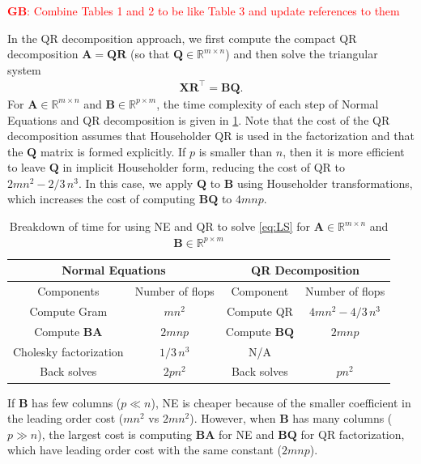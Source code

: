 \documentclass{article}
\newcommand{\mat}[1]{\mathbf{#1}}
\newcommand{\GB}[1]{\textcolor{red}{\textbf{GB}: #1}}
\begin{document}
\GB{Combine Tables 1 and 2 to be like Table 3 and update references to them}


In the QR decomposition approach, we first compute the compact QR decomposition $\mat{A} = \mat{Q}\mat{R}$ (so that $\mat{Q}\in \mathbb{R}^{m \times n}$) and then solve the  triangular system
\begin{align}
\label{eq:QR}  
\mat{X} \mat{R}^\top = \mat{B}\mat{Q}.
\end{align}
For $\mat{A} \in \mathbb{R}^{m \times n}$ and $\mat{B} \in \mathbb{R}^{p \times m}$, the time complexity of each step of Normal Equations and QR decomposition is given in \cref{tab:QR-NE-time}.
Note that the cost of the QR decomposition assumes that Householder QR is used in the factorization and that the $\mat{Q}$ matrix is formed explicitly.
If $p$ is smaller than $n$, then it is more efficient to leave $\mat{Q}$ in implicit Householder form, reducing the cost of QR to $2mn^2-2/3 \,n^3$.
In this case, we apply $\mat{Q}$ to $\mat{B}$ using Householder transformations, which increases the cost of computing $\mat{B}\mat{Q}$ to $4mnp$. 


\begin{table}[!ht]
  \centering
  \begin{tabular}{|c|c|c|c|}
    \hline
    \multicolumn{2}{|c|}{\textbf{Normal Equations}} & \multicolumn{2}{|c|}{\textbf{QR Decomposition}} \\
    \hline
    Components & Number of flops & Component & Number of flops\\
    \hline
    Compute Gram & $mn^2$ & Compute QR & $4mn^2 - 4/3 \, n^3$\\
    Compute $\mat{B}\mat{A}$ & $2mnp$ & Compute $\mat{B}\mat{Q}$ & $2mnp$\\
    Cholesky factorization & $1/3 \, n^3$  & N/A & \\
    Back solves & $2pn^2$  & Back solves & $pn^2$  \\
    \hline
  \end{tabular}
  \caption{Breakdown of time for using NE and QR to solve \cref{eq:LS} for $\mat{A} \in \mathbb{R}^{m \times n}$ and $\mat{B} \in \mathbb{R}^{p \times m}$}
  \label{tab:QR-NE-time}
\end{table}


If $\mat{B}$ has few columns ($p\ll n$), NE is cheaper because of the smaller coefficient in the leading order cost ($mn^2$ vs $2mn^2$). 
However, when $\mat{B}$ has many columns ($p\gg n$), the largest cost is computing $\mat{B}\mat{A}$ for NE and $\mat{B}\mat{Q}$ for QR factorization, which have leading order cost with the same constant ($2mnp$).
\end{document}
